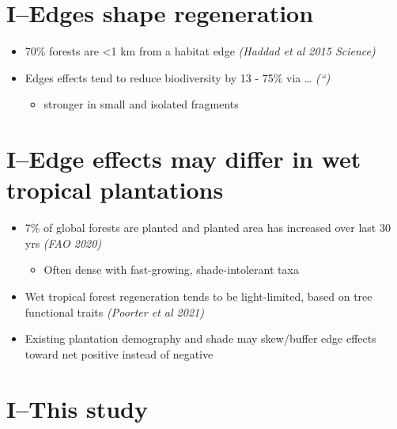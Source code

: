 \documentclass[
]{article}
\providecommand{\tightlist}{%
  \setlength{\itemsep}{0pt}\setlength{\parskip}{0pt}}
\begin{document}
\hypertarget{iedges-shape-regeneration}{%
\section{I--Edges shape regeneration}\label{iedges-shape-regeneration}}

\begin{itemize}
\item
  70\% forests are \textless1 km from a habitat edge \emph{(Haddad et al
  2015 Science)}
\item
  Edges effects tend to reduce biodiversity by 13 - 75\% via \ldots{}
  \emph{(``)}

  \begin{itemize}
  \tightlist
  \item
    stronger in small and isolated fragments
  \end{itemize}
\end{itemize}

\hypertarget{iedge-effects-may-differ-in-wet-tropical-plantations}{%
\section{I--Edge effects may differ in wet tropical
plantations}\label{iedge-effects-may-differ-in-wet-tropical-plantations}}

\begin{itemize}
\item
  7\% of global forests are planted and planted area has increased over
  last 30 yrs \emph{(FAO 2020)}

  \begin{itemize}
  \tightlist
  \item
    Often dense with fast-growing, shade-intolerant taxa
  \end{itemize}
\item
  Wet tropical forest regeneration tends to be light-limited, based on
  tree functional traits \emph{(Poorter et al 2021)}
\item
  Existing plantation demography and shade may skew/buffer edge effects
  toward net positive instead of negative
\end{itemize}

\hypertarget{ithis-study}{%
\section{I--This study}\label{ithis-study}}
\end{document}
